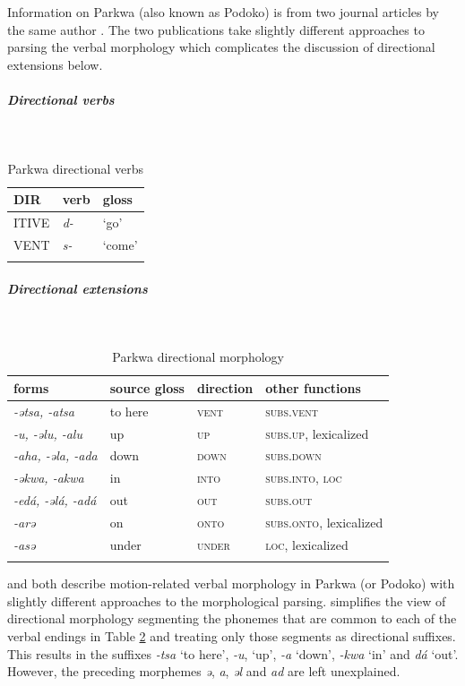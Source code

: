 Information on Parkwa (also known as Podoko) is from two journal articles by the same author \citep{jarvisPodokoVerbalDirectionals1983,jarvisEsquisseGrammaticalePodoko1989}. The two publications take slightly different approaches to parsing the verbal morphology which complicates the discussion of directional extensions below. 

\subparagraph{Directional verbs}~

\begin{table}[H]
	\caption{Parkwa directional verbs} 
	\label{tab:parkV}
	\begin{tabular}{lll} %
		\lsptoprule
		DIR & verb & gloss   \\ %
		\midrule
		ITIVE & \textit{d-} & `go' \\
		VENT & \textit{s-} & `come' \\
		\lspbottomrule
	\end{tabular}
\end{table}

\subparagraph{Directional extensions}~

\begin{table}[H]
	\caption{Parkwa directional morphology}
	\label{tab:park}
	\begin{tabular}{llll} %
		\lsptoprule
		forms & source gloss & direction  & other functions  \\ %
		\midrule
		\textit{-ətsa, -atsa}  &  {to here}  &  \textsc{vent} & \textsc{subs.vent}  \\
		\textit{-u, -əlu, -alu}  &  {up}  & \textsc{up}  &  \textsc{subs.up}, lexicalized \\
		\textit{-aha, -əla, -ada}  &  {down}  &    \textsc{down} &  \textsc{subs.down} \\
		\textit{-əkwa, -akwa}  &  {in}  &   \textsc{into}  &  \textsc{subs.into}, \textsc{loc}   \\
		\textit{-edá, -əlá, -adá} & {out} & \textsc{out} &  \textsc{subs.out}  \\
		\textit{-arə} & on & \textsc{onto} & \textsc{subs.onto}, lexicalized \\
		\textit{-asə} & under & \textsc{under} &  \textsc{loc}, lexicalized   \\
		\lspbottomrule
	\end{tabular}
\end{table} 

\citet{jarvisPodokoVerbalDirectionals1983} and \citet{jarvisEsquisseGrammaticalePodoko1989} both describe motion-related verbal morphology in Parkwa (or Podoko) with slightly different approaches to the morphological parsing. \citet[322--323]{jarvisPodokoVerbalDirectionals1983} simplifies the view of directional morphology segmenting the phonemes that are common to each of the verbal endings in Table \ref{tab:park} and treating only those segments as directional suffixes. This results in the suffixes \textit{-tsa} `to here', \textit{-u}, `up', \textit{-a} `down', \textit{-kwa} `in' and \textit{dá} `out'. However, the preceding morphemes \textit{ə}, \textit{a}, \textit{əl} and \textit{ad} are left unexplained. 

